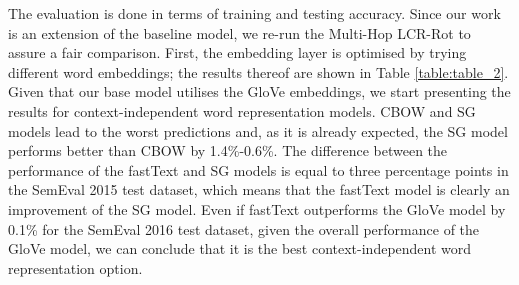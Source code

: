 \documentclass[hidelinks]{llncs}
\begin{document}
The evaluation is done in terms of training and testing accuracy. Since our work is an extension of the baseline model, we re-run the Multi-Hop LCR-Rot to assure a fair comparison. First, the embedding layer is optimised by trying different word embeddings; the results thereof are shown in Table \ref{table:table_2}. Given that our base model \cite{wallaart2019hybrid} utilises the GloVe embeddings, we start presenting the results for context-independent word representation models. CBOW and SG models lead to the worst predictions and, as it is already expected, the SG model performs better than CBOW by 1.4\%-0.6\%.
The difference between the performance of the fastText and SG models is equal to three percentage points in the SemEval 2015 test dataset, which means that the fastText model is clearly an improvement of the SG model. Even if fastText outperforms the GloVe model by 0.1\% for the SemEval 2016 test dataset, given the overall performance of the GloVe model, we can conclude that it is the best context-independent word representation option. 

\begin{table}[bp]
\vspace{-0.7cm}
\centering
\footnotesize

\setlength{\tabcolsep}{0pt} \caption{\footnotesize {Comparison between the four methods proposed for HAABSA++ using accuracy. The best results are given in bold font.}}
\label{table:table_3}
\end{table}
\end{document}
